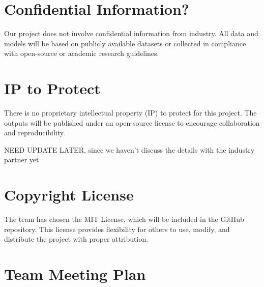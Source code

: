 \documentclass{article}
\begin{document}

\section{Confidential Information?}


Our project does not involve confidential information from industry. 
All data and models will be based on publicly available datasets or 
collected in compliance with open-source or academic research guidelines.

\section{IP to Protect}


There is no proprietary intellectual property (IP) to protect for this project. 
The outputs will be published under an open-source license to encourage 
collaboration and reproducibility.

NEED UPDATE LATER, since we haven't discuss the details with the industry partner yet.

\section{Copyright License}


The team has chosen the MIT License, which will be included in the GitHub 
repository. This license provides flexibility for others to use, modify, 
and distribute the project with proper attribution.


\section{Team Meeting Plan}
\end{document}
